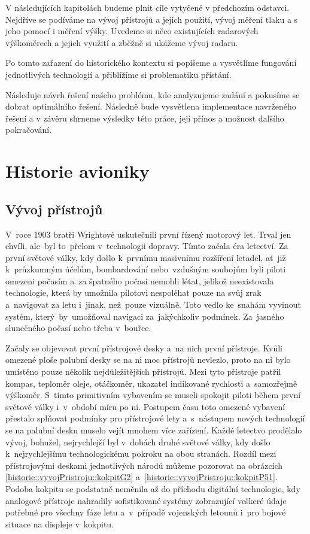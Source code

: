 	V následujících kapitolách budeme plnit cíle vytyčené v předchozím odstavci. Nejdříve se podíváme na vývoj přístrojů a jejich použití, vývoj měření tlaku a s jeho pomocí i měření výšky. Uvedeme si něco existujících radarových výškoměrech a jejich využití a zběžně si ukážeme vývoj radaru.\par
	Po tomto zařazení do historického kontextu si popíšeme a vysvětlíme fungování jednotlivých technologií a přiblížíme si problematiku přistání.\par
	Následuje návrh řešení našeho problému, kde analyzujeme zadání a pokusíme se dobrat optimálního řešení. Následně bude vysvětlena implementace navrženého řešení a v závěru shrneme výsledky této práce, její přínos a možnost dalšího pokračování.

\chapter{Historie avioniky}
	\section{Vývoj přístrojů}
	
		V~roce 1903 bratři Wrightové uskutečnili první řízený motorový let. Trval jen chvíli, ale~byl to~přelom v~technologii dopravy. Tímto začala éra letectví. Za první světové války, kdy došlo k~prvnímu masivnímu rozšíření letadel,  ať~již k~průzkumným účelům, bombardování nebo~vzdušným soubojům byli piloti omezeni počasím a~za špatného počasí nemohli létat, jelikož neexistovala technologie, která by umožnila pilotovi nespoléhat pouze na svůj zrak a~navigovat za letu i~jinak, než~pouze vizuálně. Toto vedlo ke~snahám vyvinout systém, který~by~umožňoval navigaci za~jakýchkoliv podmínek. Za~jasného slunečného počasí nebo třeba v~bouřce.\par
		
		Začaly se objevovat první přístrojové desky a~na nich první přístroje. Kvůli omezené ploše palubní desky se na ni moc přístrojů nevlezlo, proto na ni bylo umístěno pouze několik nejdůležitějších přístrojů. Mezi tyto přístroje patřil kompas, teploměr oleje, otáčkoměr, ukazatel indikované rychlosti a~samozřejmě výškoměr. S~tímto primitivním vybavením se museli spokojit piloti během první světové války i~v~období míru po ní. Postupem času toto omezené vybavení přestalo splňovat podmínky pro přístrojové lety a~s~nástupem nových technologií se na palubní desku muselo vejít mnohem více zařízení. Každé letectvo prodělalo vývoj, bohužel, nejrychlejší byl v~dobách druhé světové války, kdy došlo k~nejrychlejšímu technologickému pokroku na obou stranách. Rozdíl mezi přístrojovými deskami jednotlivých národů můžeme pozorovat na obrázcích \ref{historie::vyvojPristroju::kokpitG2} a~\ref{historie::vyvojPristroju::kokpitP51}.
		Podoba kokpitu se podstatně neměnila až do příchodu digitální technologie, kdy analogové přístroje nahradily sofistikované systémy zobrazující veškeré údaje potřebné pro všechny fáze letu a~v~případě vojenských letounů i~pro bojové situace na displeje v~kokpitu. 
		
